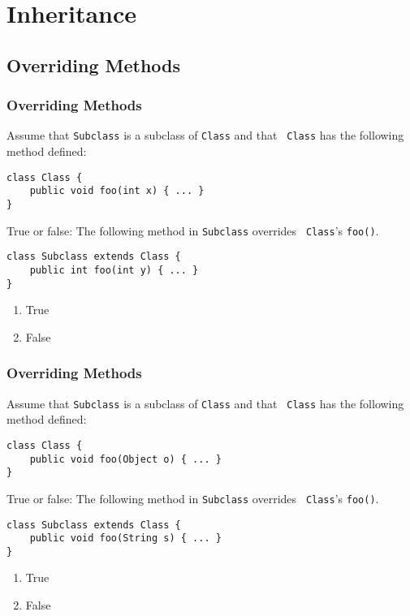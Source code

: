 \documentclass[9pt]{beamer}
\begin{document}
\section{Inheritance}
\subsection{Overriding Methods}
\begin{frame}[fragile]
  \frametitle{Overriding Methods}
  Assume that {\tt Subclass} is a subclass of {\tt Class} and that {\tt
  Class} has the following method defined:

  \begin{lstlisting}
class Class {
    public void foo(int x) { ... }
}
  \end{lstlisting}

  True or false: The following method in {\tt Subclass} overrides {\tt
  Class}'s {\tt foo()}.

  \begin{lstlisting}
class Subclass extends Class {
    public int foo(int y) { ... }
}
  \end{lstlisting}

  \begin{enumerate}
    \item
      True
    \item
      \alert<2>{False}
  \end{enumerate}
\end{frame}

\begin{frame}[fragile]
  \frametitle{Overriding Methods}
  Assume that {\tt Subclass} is a subclass of {\tt Class} and that {\tt
  Class} has the following method defined:

  \begin{lstlisting}
class Class {
    public void foo(Object o) { ... }
}
  \end{lstlisting}

  True or false: The following method in {\tt Subclass} overrides {\tt
  Class}'s {\tt foo()}.

  \begin{lstlisting}
class Subclass extends Class {
    public void foo(String s) { ... }
}
  \end{lstlisting}

  \begin{enumerate}
    \item
      True
    \item
      \alert<2>{False}
  \end{enumerate}
\end{frame}
\end{document}
